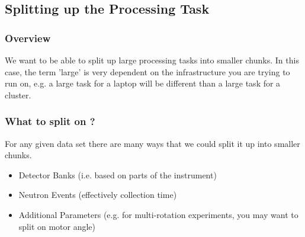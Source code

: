 \subsection{Splitting up the Processing Task}

\subsubsection{Overview}

We want to be able to split up large processing tasks into smaller chunks.  In this case, the term 'large' is very dependent on the infrastructure you are trying to run on, e.g. a large task for a laptop will be different than a large task for a cluster.

\subsubsection{What to split on ?}

For any given data set there are many ways that we could split it up into smaller chunks.  

\begin{itemize}
\item Detector Banks (i.e. based on parts of the instrument)
\item Neutron Events (effectively collection time)
\item Additional Parameters (e.g. for multi-rotation experiments, you may want to split on motor angle)
\end{itemize}

